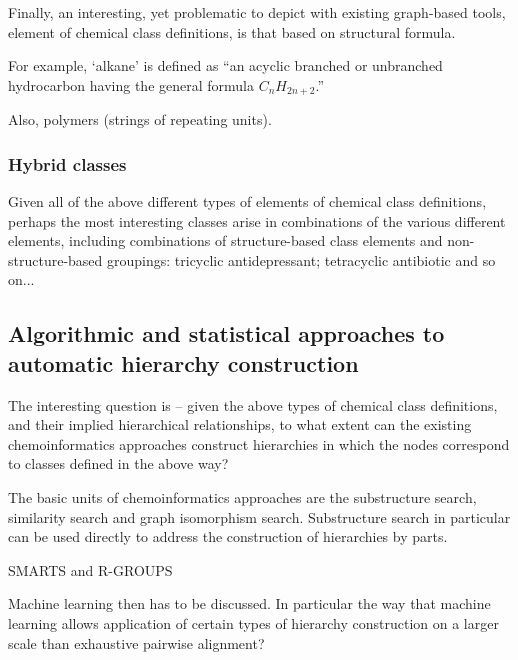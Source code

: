 \documentclass[10pt]{bmc_article}
\newenvironment{bmcformat}{\baselineskip20pt\sloppy\setboolean{publ}{false}}{\baselineskip20pt\sloppy}
\begin{document}
\begin{bmcformat}
Finally, an interesting, yet problematic to depict with existing graph-based tools, element of chemical class definitions, is that based on structural formula. 

For example, `alkane' is defined as ``an acyclic branched or unbranched hydrocarbon having the general formula $C_{n}H_{2n+2}$.'' 

Also, polymers (strings of repeating units).


\subsubsection*{Hybrid classes}

Given all of the above different types of elements of chemical class definitions, perhaps the most interesting classes arise in combinations of the various different elements, including combinations of structure-based class elements and non-structure-based groupings:  tricyclic antidepressant; tetracyclic antibiotic and so on...



\subsection*{Algorithmic and statistical approaches to automatic hierarchy construction}
\label{sec:resultscheminf}


The interesting question is -- given the above types of chemical class definitions, and their implied hierarchical relationships, to what extent can the existing chemoinformatics approaches construct hierarchies in which the nodes correspond to classes defined in the above way? 

The basic units of chemoinformatics approaches are the substructure search, similarity search and graph isomorphism search.  Substructure search in particular can be used directly to address the construction of hierarchies by parts. 

SMARTS and R-GROUPS

Machine learning then has to be discussed.  In particular the way that machine learning allows application of certain types of hierarchy construction on a larger scale than exhaustive pairwise alignment?  


\end{bmcformat}
\end{document}
